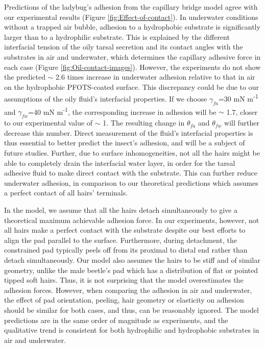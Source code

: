 \documentclass[vruler,JEB]{COB}%
\begin{document}
Predictions of the ladybug's adhesion from the capillary bridge model
agree with our experimental results (Figure \ref{fig:Effect-of-contact}).
In underwater conditions without a trapped air bubble, adhesion to a hydrophobic
substrate is significantly larger than to a hydrophilic substrate.
This is explained by the different interfacial tension of the oily tarsal secretion and its contact
angles with the substrates in air and underwater, which determines
the capillary adhesive force in each case (Figure \ref{fig:Oil-contact-images}).
However, the experiments do not show the predicted $\sim$ 2.6 times
increase in underwater adhesion relative to that in air on the hydrophobic
PFOTS-coated surface. This discrepancy could be due to our assumptions of
the oily fluid's interfacial properties. If we choose $\gamma_{fa}$=30
mN m\protect\textsuperscript{-1} and $\gamma_{fw}$=40 mN m\protect\textsuperscript{-1}, the corresponding increase in adhesion
will be $\sim$ 1.7, closer to our experimental value of $\sim$ 1.
The resulting change in $\theta_{fa}$ and $\theta_{fw}$ will further
decrease this number. Direct measurement of the fluid's interfacial
properties is thus essential to better predict the insect's adhesion,
and will be a subject of future studies. Further, due to surface inhomogeneities,
not all the hairs might be able to completely drain the interfacial
water layer, in order for the tarsal adhesive fluid to make direct contact
with the substrate. This can further reduce underwater adhesion, in
comparison to our theoretical predictions which assumes a perfect
contact of all hairs' terminals.

In the model, we assume that all the hairs detach simultaneously to
give a theoretical maximum achievable adhesion force. In our experiments,
however, not all hairs make a perfect contact with the substrate despite our 
best efforts to align the pad parallel to the surface. Furthermore, during detachment, 
the constrained pad typically peels off from its proximal to distal end rather
than detach simultaneously. Our model also assumes the hairs to be stiff and 
of similar geometry, unlike the male beetle's pad which has a distribution
of flat or pointed tipped soft hairs. Thus, it is not surprising that the
model overestimates the adhesion forces. However, when comparing the adhesion in air and underwater,
the effect of pad orientation, peeling, hair geometry or elasticity on adhesion should be similar for both cases, and thus, can be reasonably ignored. The model predictions are
in the same order of magnitude as experiments, and the qualitative
trend is consistent for both hydrophilic and hydrophobic substrates
in air and underwater.
\end{document}
